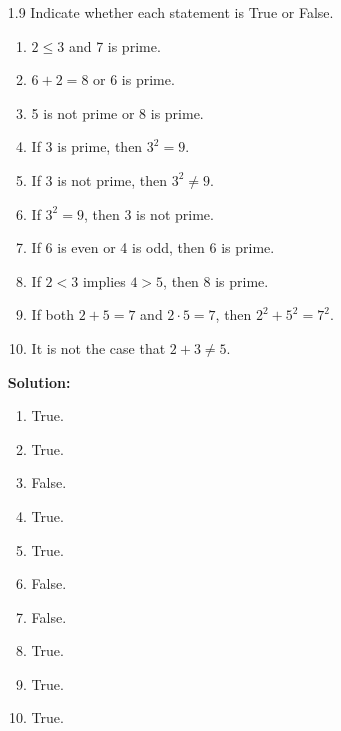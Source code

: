 \begin{enumerate}
\begin{enumerate}
\begin{center}
            \end{center}
      \end{enumerate}

   \item[1.9] Indicate whether each statement is True or False.
      \begin{enumerate}
         \item $2 \le 3$ and 7 is prime.
         \item $6 + 2 = 8$ or 6 is prime.
         \item 5 is not prime or 8 is prime.
         \item If 3 is prime, then $3^2 = 9$.
         \item If 3 is not prime, then $3^2 \neq 9$.
         \item If $3^2 = 9$, then 3 is not prime.
         \item If 6 is even or 4 is odd, then 6 is prime.
         \item If $2 < 3$ implies $4 > 5$, then 8 is prime.
         \item If both $2 + 5 = 7$ and $2 \cdot 5 = 7$, then $2^2 + 5^2 = 7^2$.
         \item It is not the case that $2 + 3 \neq 5$.
      \end{enumerate}

      \textbf{Solution:}

      \begin{enumerate}
         \item True.
         \item True.
         \item False.
         \item True.
         \item True.
         \item False.
         \item False.
         \item True.
         \item True.
         \item True.
      \end{enumerate}


\end{enumerate}
